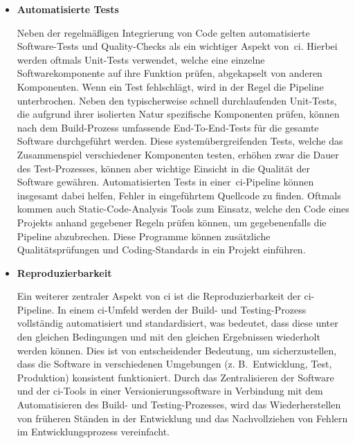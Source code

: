 \begin{itemize}
    \item {
        \textbf{Automatisierte Tests}\par
        Neben der regelmäßigen Integrierung von Code gelten automatisierte Software-Tests und Quality-Checks als ein
        wichtiger Aspekt von\ \acrshort{ci}.
        Hierbei werden oftmals Unit-Tests verwendet, welche eine einzelne Softwarekomponente auf
        ihre Funktion prüfen, abgekapselt von anderen Komponenten.
        Wenn ein Test fehlschlägt, wird in der Regel die Pipeline unterbrochen.
        Neben den typischerweise schnell durchlaufenden Unit-Tests, die aufgrund ihrer isolierten Natur spezifische
        Komponenten prüfen, können nach dem Build-Prozess umfassende End-To-End-Tests für die gesamte Software
        durchgeführt werden.
        Diese systemübergreifenden Tests, welche das Zusammenspiel verschiedener Komponenten testen, erhöhen zwar die
        Dauer des Test-Prozesses, können aber wichtige Einsicht in die Qualität der Software gewähren.
        Automatisierten Tests in einer\ \acrshort{ci}-Pipeline können insgesamt dabei helfen, Fehler in eingeführtem
        Quellcode zu finden.
        Oftmals kommen auch Static-Code-Analysis Tools zum Einsatz, welche den Code eines Projekts anhand gegebener
        Regeln prüfen können, um gegebenenfalls die Pipeline abzubrechen.
        Diese Programme können zusätzliche Qualitätsprüfungen und Coding-Standards in ein Projekt einführen.
    }

    \item {
        \textbf{Reproduzierbarkeit}\par
        Ein weiterer zentraler Aspekt von \acrlong{ci} ist die Reproduzierbarkeit der \acrshort{ci}-Pipeline.
        In einem \acrshort{ci}-Umfeld werden der Build- und Testing-Prozess vollständig automatisiert und
        standardisiert, was bedeutet, dass diese unter den gleichen Bedingungen und mit den gleichen Ergebnissen
        wiederholt werden können.
        Dies ist von entscheidender Bedeutung, um sicherzustellen, dass die Software in verschiedenen Umgebungen
        (z. B.\ Entwicklung, Test, Produktion) konsistent funktioniert.
        Durch das Zentralisieren der Software und der \acrshort{ci}-Tools in einer Versionierungssoftware in
        Verbindung mit dem Automatisieren des Build- und Testing-Prozesses, wird das Wiederherstellen von früheren
        Ständen in der Entwicklung und das Nachvollziehen von Fehlern im Entwicklungsprozess vereinfacht.
    }


\end{itemize}
